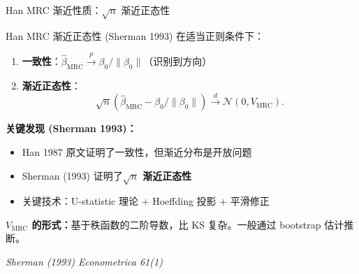 \documentclass[aspectratio=169, 10pt]{beamer}
\begin{document}
\begin{frame}{Han MRC 渐近性质：$\sqrt{n}$ 渐近正态性}

  \begin{definitionbox}{{Han MRC 渐近正态性 (Sherman 1993)}}
    在适当正则条件下：
    \begin{enumerate}\setlength{\itemsep}{1pt}
      \item \textbf{一致性}：$\hat\beta_{\text{MRC}} \overset{p}{\to} \beta_0 / \|\beta_0\|$（识别到方向）
      \item \textbf{渐近正态性}：
      $$\sqrt{n}(\hat\beta_{\text{MRC}} - \beta_0/\|\beta_0\|)
      \overset{d}{\to} \mathcal{N}(0, V_{\text{MRC}}).$$
    \end{enumerate}
  \end{definitionbox}

  \begin{highlightbox}
    \textbf{关键发现 (Sherman 1993)：}
    \begin{itemize}\setlength{\itemsep}{1pt}
      \item Han 1987 原文证明了一致性，但渐近分布是开放问题
      \item Sherman (1993) 证明了\textbf{$\sqrt{n}$ 渐近正态性}
      \item 关键技术：U-statistic 理论 + Hoeffding 投影 + 平滑修正
    \end{itemize}
  \end{highlightbox}

  \textbf{$V_{\text{MRC}}$ 的形式：}基于秩函数的二阶导数，比 KS 复杂。一般通过 bootstrap 估计推断。

  \hfill{\scriptsize\textit{Sherman (1993) Econometrica 61(1)}}

\end{frame}
\end{document}
